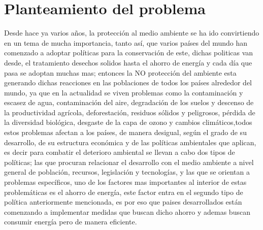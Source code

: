 \documentclass[12pt,letterpaper]{report}
\begin{document}
\section{Planteamiento del problema}
Desde hace ya varios años, la protección al medio ambiente se ha ido convirtiendo en un tema de mucha importancia,
tanto así, que varios países del mundo han comenzado a adoptar políticas para la conservación de este, dichas politicas van desde, el tratamiento desechos solidos hasta el ahorro de energía y cada día que pasa se adoptan muchas mas; entonces la NO protección del ambiente esta generando dichas reacciones en las poblaciones de todos los países alrededor del mundo, ya que en la actualidad se viven problemas como la contaminación y escasez de agua, contaminación del aire, degradación de los suelos y descenso de la productividad agrícola, deforestación, residuos sólidos y peligrosos, pérdida de la diversidad biológica, desgaste de la capa de ozono y cambios climáticos,todos estos problemas afectan a los países, de manera desigual, según el grado de su desarrollo, de su estructura económica y de las políticas ambientales que aplican, es decir para combatir el deterioro ambiental se llevan a cabo dos tipos de políticas; las que procuran relacionar el desarrollo con el medio ambiente a nivel general de población, recursos, legislación y tecnologías, y las que se orientan a problemas específicos, uno de los factores mas importantes al interior de estas problemáticas es el ahorro de energía, este factor entra en el segundo tipo de política anteriormente mencionada, es por eso que paises desarrollados están comenzando a implementar medidas que buscan dicho ahorro y ademas buscan consumir energía pero de manera eficiente.
\end{document}
